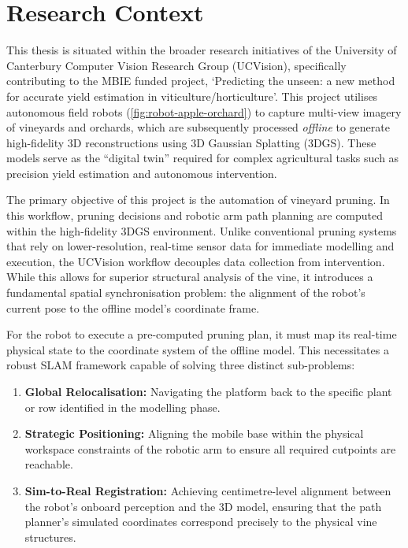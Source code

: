 \section{Research Context}
\label{sec:research-context}

This thesis is situated within the broader research initiatives of the University of Canterbury Computer Vision Research Group (UCVision), specifically contributing to the MBIE funded project, `Predicting the unseen: a new method for accurate yield estimation in viticulture/horticulture'. This project utilises autonomous field robots (\cref{fig:robot-apple-orchard}) to capture multi-view imagery of vineyards and orchards, which are subsequently processed \textit{offline} to generate high-fidelity 3D reconstructions using 3D Gaussian Splatting (3DGS). These models serve as the ``digital twin'' required for complex agricultural tasks such as precision yield estimation and autonomous intervention.

The primary objective of this project is the automation of vineyard pruning. In this workflow, pruning decisions and robotic arm path planning are computed within the high-fidelity 3DGS environment. Unlike conventional pruning systems that rely on lower-resolution, real-time sensor data for immediate modelling and execution, the UCVision workflow decouples data collection from intervention. While this allows for superior structural analysis of the vine, it introduces a fundamental spatial synchronisation problem: the alignment of the robot's current pose to the offline model's coordinate frame.

For the robot to execute a pre-computed pruning plan, it must map its real-time physical state to the coordinate system of the offline model. This necessitates a robust SLAM framework capable of solving three distinct sub-problems:
\begin{enumerate}
    \item \textbf{Global Relocalisation:} Navigating the platform back to the specific plant or row identified in the modelling phase.
    \item \textbf{Strategic Positioning:} Aligning the mobile base within the physical workspace constraints of the robotic arm to ensure all required cutpoints are reachable.
    \item \textbf{Sim-to-Real Registration:} Achieving centimetre-level alignment between the robot's onboard perception and the 3D model, ensuring that the path planner's simulated coordinates correspond precisely to the physical vine structures.
\end{enumerate}


